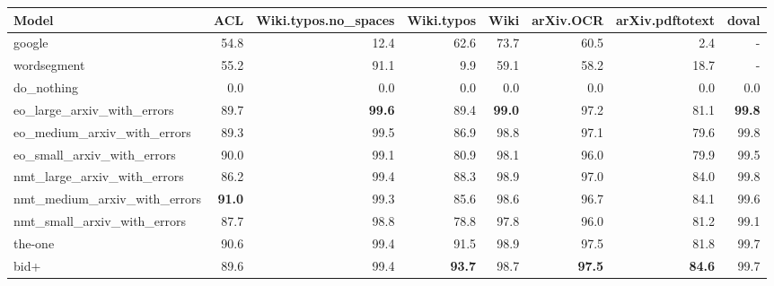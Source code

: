 \begin{tabular}{lrrrrrrr} \hline
Model & ACL & Wiki.typos.no\_spaces & Wiki.typos & Wiki & arXiv.OCR & arXiv.pdftotext & doval \\ \hline
google & 54.8 & 12.4 & 62.6 & 73.7 & 60.5 & 2.4 & - \\ 
wordsegment & 55.2 & 91.1 & 9.9 & 59.1 & 58.2 & 18.7 & - \\ 
do\_nothing & 0.0 & 0.0 & 0.0 & 0.0 & 0.0 & 0.0 & 0.0 \\ \hline
eo\_large\_arxiv\_with\_errors & 89.7 & \textbf{99.6} & 89.4 & \textbf{99.0} & 97.2 & 81.1 & \textbf{99.8} \\ 
eo\_medium\_arxiv\_with\_errors & 89.3 & 99.5 & 86.9 & 98.8 & 97.1 & 79.6 & 99.8 \\ 
eo\_small\_arxiv\_with\_errors & 90.0 & 99.1 & 80.9 & 98.1 & 96.0 & 79.9 & 99.5 \\ \hline
nmt\_large\_arxiv\_with\_errors & 86.2 & 99.4 & 88.3 & 98.9 & 97.0 & 84.0 & 99.8 \\ 
nmt\_medium\_arxiv\_with\_errors & \textbf{91.0} & 99.3 & 85.6 & 98.6 & 96.7 & 84.1 & 99.6 \\ 
nmt\_small\_arxiv\_with\_errors & 87.7 & 98.8 & 78.8 & 97.8 & 96.0 & 81.2 & 99.1 \\ \hline
the-one & 90.6 & 99.4 & 91.5 & 98.9 & 97.5 & 81.8 & 99.7 \\ 
bid+ & 89.6 & 99.4 & \textbf{93.7} & 98.7 & \textbf{97.5} & \textbf{84.6} & 99.7 \\ \hline
\end{tabular}